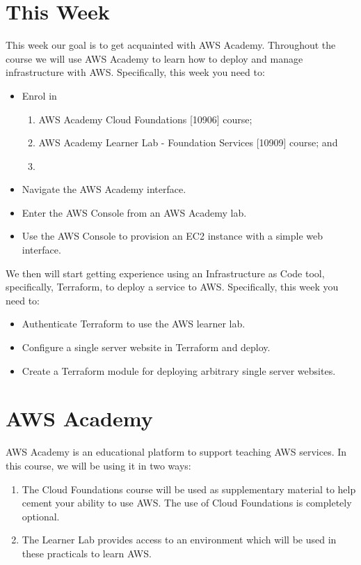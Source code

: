 \documentclass{csse4400}
\begin{document}
\section{This Week}
This week our goal is to get acquainted with AWS Academy.
Throughout the course we will use AWS Academy to learn how to deploy and manage infrastructure with AWS.
Specifically, this week you need to:
\begin{itemize}
    \item Enrol in
    \begin{enumerate}
        \item AWS Academy Cloud Foundations [10906] course;
        \item AWS Academy Learner Lab - Foundation Services [10909] course; and
        \item {}
    \end{enumerate}
    \item Navigate the AWS Academy interface.
    \item Enter the AWS Console from an AWS Academy lab.
    \item Use the AWS Console to provision an EC2 instance with a simple web interface.
\end{itemize}

We then will start getting experience using an Infrastructure as Code tool, specifically, Terraform,
to deploy a service to AWS.
Specifically, this week you need to:
\begin{itemize}
    \item Authenticate Terraform to use the AWS learner lab.
    \item Configure a single server website in Terraform and deploy.
    \item Create a Terraform module for deploying arbitrary single server websites.
\end{itemize}



\section{AWS Academy}
AWS Academy is an educational platform to support teaching AWS services.
In this course, we will be using it in two ways:
\begin{enumerate}
    \item The Cloud Foundations course will be used as supplementary material to help cement your ability to use AWS.
          The use of Cloud Foundations is completely optional.
    \item The Learner Lab provides access to an environment which will be used in these practicals to learn AWS. 
\end{enumerate}
\end{document}
